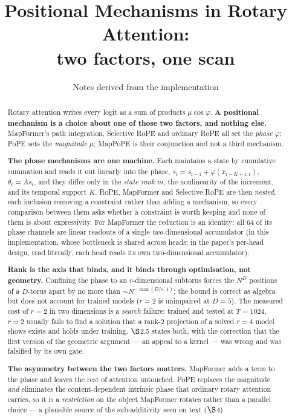 \documentclass[11pt]{article}
\title{Positional Mechanisms in Rotary Attention:\\ two factors, one scan}
\author{Notes derived from the implementation}
\date{}
\begin{document}
\maketitle

\begin{abstract}
\noindent
Rotary attention writes every logit as a sum of products
$\mu\cos\varphi$. \textbf{A positional mechanism is a choice about one of those
two factors, and nothing else.} MapFormer's path integration, Selective RoPE and
ordinary RoPE all set the \emph{phase} $\varphi$; PoPE sets the \emph{magnitude}
$\mu$; MapPoPE is their conjunction and not a third mechanism.

\medskip
\noindent\textbf{The phase mechanisms are one machine.} Each maintains a state by
cumulative summation and reads it out linearly into the phase,
$s_t = s_{t-1} + \varphi(x_{t-K+1:t})$, $\theta_t = A s_t$, and they differ only in
the \emph{state rank} $m$, the nonlinearity of the increment, and its temporal
support $K$. RoPE, MapFormer and Selective RoPE are then \emph{nested}, each
inclusion removing a constraint rather than adding a mechanism, so every
comparison between them asks whether a constraint is worth keeping and none of
them is about expressivity. For MapFormer the reduction is an identity: all $64$
of its phase channels are linear readouts of a single \emph{two}-dimensional
accumulator (in this implementation, whose bottleneck is shared across heads; in the
paper's per-head design, read literally, each head reads its own two-dimensional
accumulator).

\medskip
\noindent\textbf{Rank is the axis that binds, and it binds through optimisation,
not geometry.} Confining the phase to an $r$-dimensional subtorus forces the $N^D$
positions of a $D$-torus apart by no more than $\sim N^{-\max(D/r,\,1)}$; the bound is
correct as algebra but does not account for trained models ($r=2$ is unimpaired at
$D=5$). The measured cost of $r=2$ in two dimensions is a \emph{search} failure:
trained and tested at $T=1024$, $r=2$ usually fails to find a solution that a rank-$2$
projection of a solved $r=4$ model shows exists and holds under training. $\S$2.5
states both, with the correction that the first version of the geometric argument
--- an appeal to a kernel --- was wrong and was falsified by its own gate.

\medskip
\noindent\textbf{The asymmetry between the two factors matters.} MapFormer adds a
term to the phase and leaves the rest of attention untouched. PoPE replaces the
magnitude \emph{and} eliminates the content-dependent intrinsic phase that
ordinary rotary attention carries, so it is a \emph{restriction} on the object
MapFormer rotates rather than a parallel choice --- a plausible source of the
sub-additivity seen on text ($\S$4).


\end{abstract}
\end{document}
